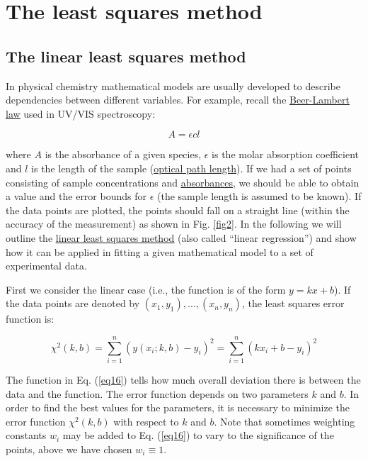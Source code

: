\documentclass[byrevtex,amssymb,aps,pra,floatfix,letterpaper]{revtex4}
\begin{document}
\section{The least squares method}
\label{sec7}

\subsection{The linear least squares method}
\label{sec7.1}

In physical chemistry mathematical models are usually developed to describe dependencies between different variables. For example, recall the \href{http://en.wikipedia.org/wiki/Beer-Lambert_law}{\underline{Beer-Lambert law}} used in UV/VIS spectroscopy:

\begin{equation}
\label{eq15}
A = \epsilon cl
\end{equation}

\noindent
where $A$ is the absorbance of a given species, $\epsilon$ is the molar absorption coefficient and $l$ is the length of the sample (\href{http://en.wikipedia.org/wiki/Optical_path_length}{\underline{optical path length}}). If we had a set of points consisting of sample concentrations and \href{http://en.wikipedia.org/wiki/Absorbance}{\underline{absorbances}}, we should be able to obtain a value and the error bounds for $\epsilon$ (the sample length is assumed to be known). If the data points are plotted, the points should fall on a straight line (within the accuracy of the measurement) as shown in Fig. \ref{fig2}. In the following we will outline the \href{http://en.wikipedia.org/wiki/Linear_regression}{\underline{linear least squares method}} (also called ``linear regression'') and show how it can be applied in fitting a given mathematical model to a set of experimental data.

First we consider the linear case (i.e., the function is of the form $y = kx + b$). If the data
points are denoted by $(x_1, y_1), ..., (x_n, y_n)$, the least squares error function is:

\begin{equation}
\label{eq16}
\chi^2(k,b) = \sum\limits_{i=1}^{n}\left(y(x_i; k, b) - y_i\right)^2 = \sum\limits_{i=1}^{n}\left(kx_i + b - y_i\right)^2
\end{equation}

\noindent
The function in Eq. (\ref{eq16}) tells how much overall deviation there is between the data and the function. The error function depends on two parameters $k$ and $b$. In order to find the best values for the parameters, it is necessary to minimize the error function $\chi^2(k,b)$ with respect to $k$ and $b$. Note that sometimes weighting constants $w_i$ may be added to Eq. (\ref{eq16}) to vary to the significance of the points, above we have chosen $w_i \equiv 1$.
\end{document}
